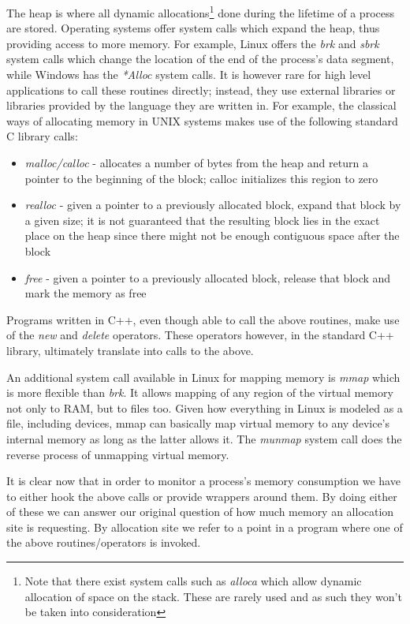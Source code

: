 The heap is where all dynamic allocations\footnote{Note that there exist system calls such as \textit{alloca} which allow dynamic allocation of space on the stack. These are rarely used and as such they won't be taken into consideration} done during the lifetime of a process are stored. Operating systems offer system calls which expand the heap, thus providing access to more memory. For example, Linux offers the \textit{brk} and \textit{sbrk} system calls which change the location of the end of the process's data segment, while Windows has the \textit{*Alloc} system calls. It is however rare for high level applications to call these routines directly; instead, they use external libraries or libraries provided by the language they are written in. For example, the classical ways of allocating memory in UNIX systems makes use of the following standard C library calls:

\begin{itemize}
\item \textit{malloc/calloc} - allocates a number of bytes from the heap and return a pointer to the beginning of the block; calloc initializes this region to zero
\item \textit{realloc} - given a pointer to a previously allocated block, expand that block by a given size; it is not guaranteed that the resulting block lies in the exact place on the heap since there might not be enough contiguous space after the block
\item \textit{free} - given a pointer to a previously allocated block, release that block and mark the memory as free
\end{itemize}

Programs written in C++, even though able to call the above routines, make use of the \textit{new} and \textit{delete} operators. These operators however, in the standard C++ library, ultimately translate into calls to the above.

An additional system call available in Linux for mapping memory is \textit{mmap} which is more flexible than \textit{brk}. It allows mapping of any region of the virtual memory not only to RAM, but to files too. Given how everything in Linux is modeled as a file, including devices, mmap can basically map virtual memory to any device's internal memory as long as the latter allows it. The \textit{munmap} system call does the reverse process of unmapping virtual memory.

It is clear now that in order to monitor a process's memory consumption we have to either hook the above calls or provide wrappers around them. By doing either of these we can answer our original question of how much memory an allocation site is requesting. By allocation site we refer to a point in a program where one of the above routines/operators is invoked.

